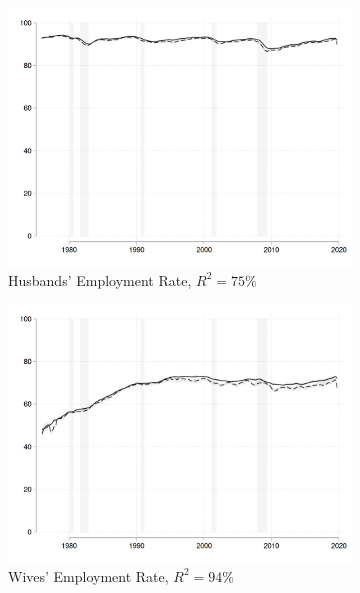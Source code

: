 \documentclass[a4paper,12pt]{article}
\begin{document}
\begin{figure}[H]
\begin{subfigure}[b]{0.475\textwidth}
    \centering
    \includegraphics[scale= 0.125]{Y04_QSA_Erate_DeNUN1_sex1_flowtype0.png}
    \caption{Husbands' Employment Rate, $R^2 = 75\%$ }
  \end{subfigure}
  \begin{subfigure}[b]{0.475\textwidth}
    \centering
    \includegraphics[scale= 0.125]{Y04_QSA_Erate_DeNUN1_sex2_flowtype0.png}
    \caption{Wives' Employment Rate, $R^2 = 94\%$ }
  \end{subfigure}
  \begin{subfigure}[b]{0.475\textwidth}
    \centering

\end{subfigure}
\end{figure}
\end{document}
